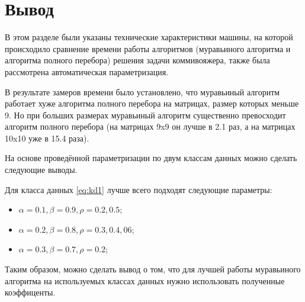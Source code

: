 \section{Вывод}

В этом разделе были указаны технические характеристики машины, на которой происходило сравнение времени работы алгоритмов (муравьиного алгоритма и алгоритма полного перебора) решения задачи коммивояжера, также была рассмотрена автоматическая параметризация.

В результате замеров времени было установлено, что муравьиный алгоритм работает хуже алгоритма полного перебора на матрицах, размер которых меньше 9.
Но при больших размерах муравьиный алгоритм существенно превосходит алгоритм полного перебора (на матрицах 9x9 он лучше в 2.1 раз, а на матрицах 10x10 уже в 15.4 раза).

На основе проведённой параметризации по двум классам данных можно сделать следующие выводы.

Для класса данных \ref{eq:kd1} лучше всего подходят следующие параметры:
\begin{itemize}[label=---]
    \item $\alpha = 0.1, \beta = 0.9, \rho = 0.2, 0.5$;
    \item $\alpha = 0.2, \beta = 0.8, \rho = 0.3, 0.4, 06$;
    \item $\alpha = 0.3, \beta = 0.7, \rho = 0.2$;
\end{itemize}  

Таким образом, можно сделать вывод о том, что для лучшей работы муравьиного алгоритма на используемых классах данных нужно использовать полученные коэффиценты.

